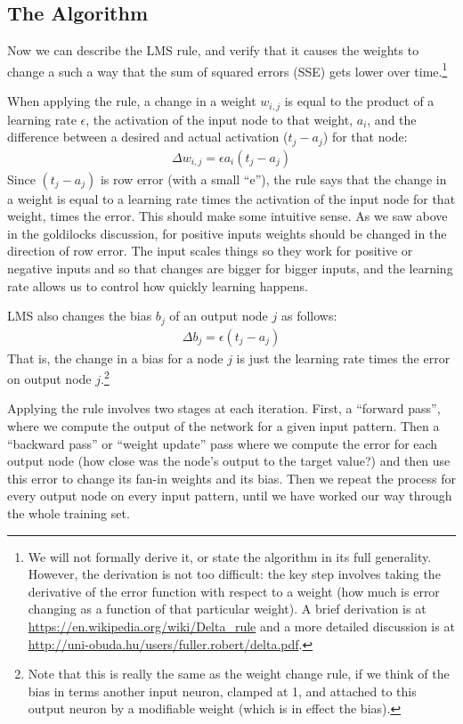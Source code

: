 \subsection{The Algorithm}

Now we can describe the LMS rule, and verify that it causes the weights to change a such a way that the sum of squared errors (SSE) gets lower over time.\footnote{We will not formally derive it, or state the algorithm in its full generality. However, the derivation is not too difficult: the key step involves taking the derivative of the error function with respect to a weight (how much is error changing as a function of that particular weight). A brief derivation is at \url{https://en.wikipedia.org/wiki/Delta_rule} and a more detailed discussion is at \url{http://uni-obuda.hu/users/fuller.robert/delta.pdf}.}

When applying the rule, a change in a weight $w_{i,j}$ is equal to the product of a learning rate $\epsilon$, the activation of the input node to that weight, $a_i$, and the difference between a desired and actual activation ($t_j - a_j$) for that node:
\begin{eqnarray*}
\Delta w_{i,j}  =  \epsilon a_i (t_j - a_j)
\end{eqnarray*}
Since $(t_j - a_j)$ is row error  (with a small ``e''), the rule says that the change in a weight is equal to a learning rate times the activation of the input node for that weight, times the error. This should make some intuitive sense. As we saw above in the goldilocks discussion, for positive inputs weights should be changed in the direction of row error. The input scales things so they work for positive or negative inputs and so that changes are bigger for bigger inputs, and the learning rate allows us to control how quickly learning happens. 

LMS also changes the bias $b_j$ of an output node $j$ as follows: 
\begin{eqnarray*}
\Delta b_j  =  \epsilon (t_j - a_j)
\end{eqnarray*}
That is, the change in a bias for a node $j$ is just the learning rate times the error on output node $j$.\footnote{Note that this is really the same as the weight change rule, if we think of the bias in terms another input neuron, clamped at 1, and attached to this output neuron by a modifiable weight (which is in effect the bias).}

Applying the rule involves two stages at each iteration. First, a ``forward pass'', where we compute the output of the network for a given input pattern. Then a ``backward pass'' or ``weight update'' pass where we compute the error for each output node (how close was the node's output to the target value?) and then use this error to change its fan-in weights and its bias. Then we repeat the process for every output node on every input pattern, until we have worked our way through the whole training set. 

